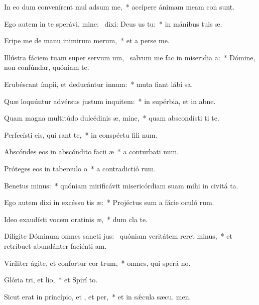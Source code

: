 \item In eo dum convenírent mul adsum me,~* accípere ánimam meam con sunt.
\item Ego autem in te sperávi, mine:~\pscross{} dixi: Deus us  tu:~* in mánibus tuis  æ.
\item Eripe me de manu inimirum merum,~* et a perse me.
\item Illústra fáciem tuam super servum um,~\pscross{} salvum me fac in miseridia a:~* Dómine, non confúndar, quóniam  te.
\item Erubéscant ímpii, et deducántur  innum:~* muta fiant lábi sa.
\item Quæ loquúntur advérsus justum inquitem:~* in supérbia, et in abne.
\item Quam magna multitúdo dulcédinis æ, mine,~* quam abscondísti ti te.
\item Perfecísti eis, qui rant  te,~* in conspéctu fili num.
\item Abscóndes eos in abscóndito facii æ~* a conturbati num.
\item Próteges eos in taberculo o~* a contradictió rum.
\item Benetus minus:~* quóniam mirificávit misericórdiam suam mihi in civitá ta.
\item Ego autem dixi in excéssu tis æ:~* Projéctus sum a fácie oculó rum.
\item Ideo exaudísti vocem oratinis æ,~* dum cla  te.
\item Dilígite Dóminum omnes sancti jus:~\pscross{} quóniam veritátem reret minus,~* et retríbuet abundánter faciénti am.
\item Viríliter ágite, et confortur cor trum,~* omnes, qui sperá  no.
\item Glória tri, et lio,~* et Spirí to.
\item Sicut erat in princípio, et , et per,~* et in sǽcula sæcu. men.
